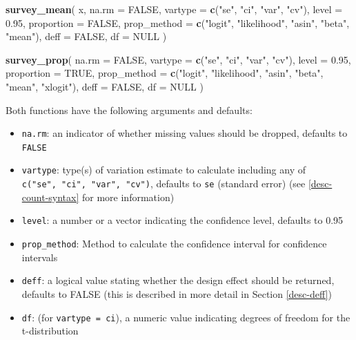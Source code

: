 \documentclass[
]{krantz}
\makeatletter
\newenvironment{Shaded}{\begin{snugshade}}{\end{snugshade}}
\newcommand{\AttributeTok}[1]{\textcolor[rgb]{0.27,0.27,0.27}{#1}}
\newcommand{\ConstantTok}[1]{\textcolor[rgb]{0.37,0.37,0.37}{#1}}
\newcommand{\FloatTok}[1]{\textcolor[rgb]{0.06,0.06,0.06}{#1}}
\newcommand{\FunctionTok}[1]{\textcolor[rgb]{0.27,0.27,0.27}{\textbf{#1}}}
\newcommand{\NormalTok}[1]{#1}
\newcommand{\StringTok}[1]{\textcolor[rgb]{0.5,0.5,0.5}{#1}}
\providecommand{\tightlist}{%
  \setlength{\itemsep}{0pt}\setlength{\parskip}{0pt}}
\newenvironment{kframe}{%
\medskip{}
\setlength{\fboxsep}{.8em}
 \def\at@end@of@kframe{}%
 \ifinner\ifhmode%
  \def\at@end@of@kframe{\end{minipage}}%
  \begin{minipage}{\columnwidth}%
 \fi\fi%
 \def\FrameCommand##1{\hskip\@totalleftmargin \hskip-\fboxsep
 \colorbox{shadecolor}{##1}\hskip-\fboxsep
     \hskip-\linewidth \hskip-\@totalleftmargin \hskip\columnwidth}%
 \MakeFramed {\advance\hsize-\width
   \@totalleftmargin\z@ \linewidth\hsize
   \@setminipage}}%
 {\par\unskip\endMakeFramed%
 \at@end@of@kframe}
\renewenvironment{Shaded}{\begin{kframe}}{\end{kframe}}
\makeatother
\begin{document}
\begin{Shaded}
\begin{Highlighting}[]
\FunctionTok{survey\_mean}\NormalTok{(}
\NormalTok{  x,}
  \AttributeTok{na.rm =} \ConstantTok{FALSE}\NormalTok{,}
  \AttributeTok{vartype =} \FunctionTok{c}\NormalTok{(}\StringTok{"se"}\NormalTok{, }\StringTok{"ci"}\NormalTok{, }\StringTok{"var"}\NormalTok{, }\StringTok{"cv"}\NormalTok{),}
  \AttributeTok{level =} \FloatTok{0.95}\NormalTok{,}
  \AttributeTok{proportion =} \ConstantTok{FALSE}\NormalTok{,}
  \AttributeTok{prop\_method =} \FunctionTok{c}\NormalTok{(}\StringTok{"logit"}\NormalTok{, }\StringTok{"likelihood"}\NormalTok{, }\StringTok{"asin"}\NormalTok{, }\StringTok{"beta"}\NormalTok{, }\StringTok{"mean"}\NormalTok{),}
  \AttributeTok{deff =} \ConstantTok{FALSE}\NormalTok{,}
  \AttributeTok{df =} \ConstantTok{NULL}
\NormalTok{)}

\FunctionTok{survey\_prop}\NormalTok{(}
  \AttributeTok{na.rm =} \ConstantTok{FALSE}\NormalTok{,}
  \AttributeTok{vartype =} \FunctionTok{c}\NormalTok{(}\StringTok{"se"}\NormalTok{, }\StringTok{"ci"}\NormalTok{, }\StringTok{"var"}\NormalTok{, }\StringTok{"cv"}\NormalTok{),}
  \AttributeTok{level =} \FloatTok{0.95}\NormalTok{,}
  \AttributeTok{proportion =} \ConstantTok{TRUE}\NormalTok{,}
  \AttributeTok{prop\_method =} \FunctionTok{c}\NormalTok{(}\StringTok{"logit"}\NormalTok{, }\StringTok{"likelihood"}\NormalTok{, }\StringTok{"asin"}\NormalTok{, }\StringTok{"beta"}\NormalTok{, }\StringTok{"mean"}\NormalTok{, }\StringTok{"xlogit"}\NormalTok{),}
  \AttributeTok{deff =} \ConstantTok{FALSE}\NormalTok{,}
  \AttributeTok{df =} \ConstantTok{NULL}
\NormalTok{)}
\end{Highlighting}
\end{Shaded}

Both functions have the following arguments and defaults:

\begin{itemize}
\tightlist
\item
  \texttt{na.rm}: an indicator of whether missing values should be dropped, defaults to \texttt{FALSE}
\item
  \texttt{vartype}: type(s) of variation estimate to calculate including any of \texttt{c("se",\ "ci",\ "var",\ "cv")}, defaults to \texttt{se} (standard error) (see \ref{desc-count-syntax} for more information)
\item
  \texttt{level}: a number or a vector indicating the confidence level, defaults to 0.95
\item
  \texttt{prop\_method}: Method to calculate the confidence interval for confidence intervals
\item
  \texttt{deff}: a logical value stating whether the design effect should be returned, defaults to FALSE (this is described in more detail in Section \ref{desc-deff})
\item
  \texttt{df}: (for \texttt{vartype\ =\ \textquotesingle{}ci\textquotesingle{}}), a numeric value indicating degrees of freedom for the t-distribution
\end{itemize}
\end{document}

